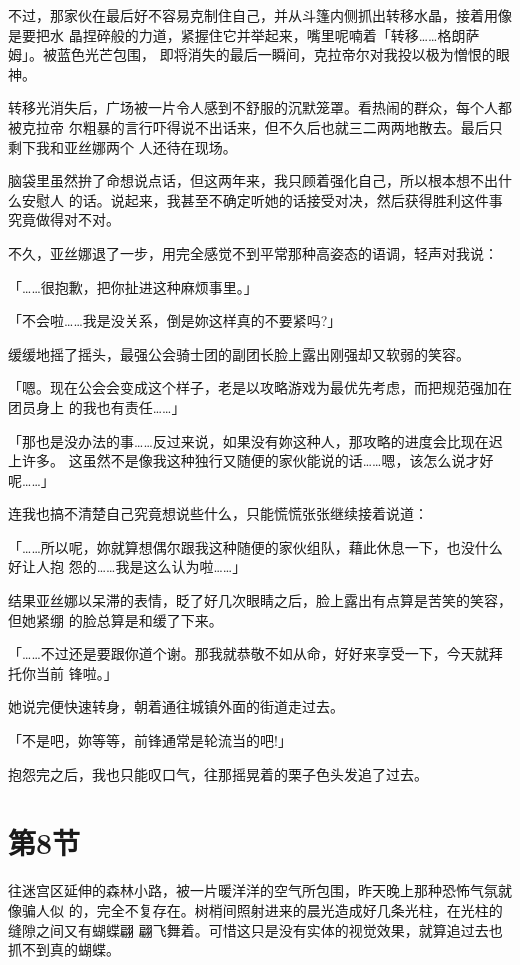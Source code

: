 \documentclass[11pt]{book}
\begin{document}
不过，那家伙在最后好不容易克制住自己，并从斗篷内侧抓出转移水晶，接着用像是要把水
晶捏碎般的力道，紧握住它并举起来，嘴里呢喃着「转移……格朗萨姆」。被蓝色光芒包围，
即将消失的最后一瞬间，克拉帝尔对我投以极为憎恨的眼神。

转移光消失后，广场被一片令人感到不舒服的沉默笼罩。看热闹的群众，每个人都被克拉帝
尔粗暴的言行吓得说不出话来，但不久后也就三二两两地散去。最后只剩下我和亚丝娜两个
人还待在现场。

脑袋里虽然拚了命想说点话，但这两年来，我只顾着强化自己，所以根本想不出什么安慰人
的话。说起来，我甚至不确定听她的话接受对决，然后获得胜利这件事究竟做得对不对。

不久，亚丝娜退了一步，用完全感觉不到平常那种高姿态的语调，轻声对我说：

「……很抱歉，把你扯进这种麻烦事里。」

「不会啦……我是没关系，倒是妳这样真的不要紧吗?」

缓缓地摇了摇头，最强公会骑士团的副团长脸上露出刚强却又软弱的笑容。

「嗯。现在公会会变成这个样子，老是以攻略游戏为最优先考虑，而把规范强加在团员身上
的我也有责任……」

「那也是没办法的事……反过来说，如果没有妳这种人，那攻略的进度会比现在迟上许多。
这虽然不是像我这种独行又随便的家伙能说的话……嗯，该怎么说才好呢……」

连我也搞不清楚自己究竟想说些什么，只能慌慌张张继续接着说道：

「……所以呢，妳就算想偶尔跟我这种随便的家伙组队，藉此休息一下，也没什么好让人抱
怨的……我是这么认为啦……」

结果亚丝娜以呆滞的表情，眨了好几次眼睛之后，脸上露出有点算是苦笑的笑容，但她紧绷
的脸总算是和缓了下来。

「……不过还是要跟你道个谢。那我就恭敬不如从命，好好来享受一下，今天就拜托你当前
锋啦。」

她说完便快速转身，朝着通往城镇外面的街道走过去。

「不是吧，妳等等，前锋通常是轮流当的吧!」

抱怨完之后，我也只能叹口气，往那摇晃着的栗子色头发追了过去。
\section{第8节}
\label{sec:orgaeb1a96}
往迷宫区延伸的森林小路，被一片暖洋洋的空气所包围，昨天晚上那种恐怖气氛就像骗人似
的，完全不复存在。树梢间照射进来的晨光造成好几条光柱，在光柱的缝隙之间又有蝴蝶翩
翩飞舞着。可惜这只是没有实体的视觉效果，就算追过去也抓不到真的蝴蝶。
\end{document}
